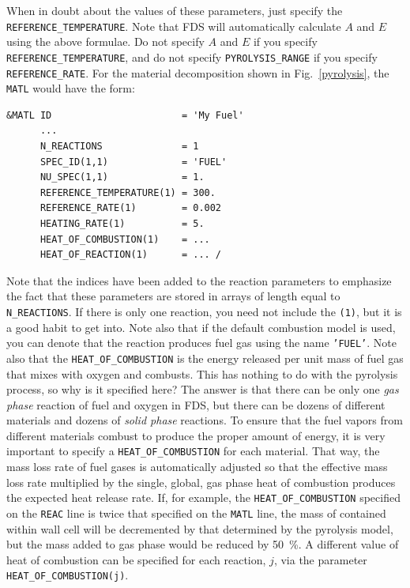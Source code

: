 \documentclass[11pt]{book}
\newcommand{\ct}{\tt\small}
\begin{document}
When in doubt about the values of
these parameters, just specify the {\ct REFERENCE\_TEMPERATURE}.
Note that FDS will automatically calculate $A$ and $E$ using the above formulae.
Do not specify $A$ and $E$ if you specify {\ct REFERENCE\_TEMPERATURE}, and do not specify {\ct PYROLYSIS\_RANGE} if you
specify {\ct REFERENCE\_RATE}.
For the material decomposition shown in Fig.~\ref{pyrolysis}, the {\ct MATL} would have the form:

\footnotesize
\begin{verbatim}
&MATL ID                       = 'My Fuel'
      ...
      N_REACTIONS              = 1
      SPEC_ID(1,1)             = 'FUEL'
      NU_SPEC(1,1)             = 1.
      REFERENCE_TEMPERATURE(1) = 300.
      REFERENCE_RATE(1)        = 0.002
      HEATING_RATE(1)          = 5.
      HEAT_OF_COMBUSTION(1)    = ...
      HEAT_OF_REACTION(1)      = ... /
\end{verbatim}
\normalsize

\noindent
Note that the indices have been added to the reaction parameters to
emphasize the fact that these parameters are stored in arrays of
length equal to {\ct N\_REACTIONS}. If there is only one reaction, you
need not include the {\ct (1)}, but it is a good habit to get into.
Note also that if the default combustion model is used, you can denote that the reaction
produces fuel gas using the name {\ct 'FUEL'}.
Note also that the {\ct HEAT\_OF\_COMBUSTION} is the energy released
per unit mass of fuel gas that mixes with oxygen and combusts.  This
has nothing to do with the pyrolysis process, so why is it specified
here? The answer is that there can be only one {\em gas phase}
reaction of fuel and oxygen in FDS, but there can be dozens of
different materials and dozens of {\em solid phase} reactions. To
ensure that the fuel vapors from different materials combust to
produce the proper amount of energy, it is very important to specify a
{\ct HEAT\_OF\_COMBUSTION} for each material. That way, the mass loss
rate of fuel gases is automatically adjusted so that the effective
mass loss rate multiplied by the single, global, gas phase heat of
combustion produces the expected heat release rate.
If, for example, the {\ct HEAT\_OF\_COMBUSTION} specified on the {\ct REAC} line is twice that
specified on the {\ct MATL} line, the mass of contained within wall
cell will be decremented by that determined by the pyrolysis model,
but the mass added to gas phase would be reduced by 50~\%. A different
value of heat of combustion can be specified for each reaction, $j$, via the parameter {\ct HEAT\_OF\_COMBUSTION(j)}.
\end{document}
